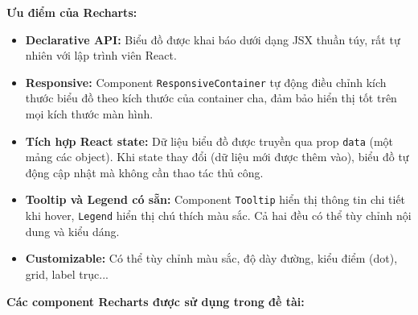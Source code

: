 \textbf{Ưu điểm của Recharts:}
\begin{itemize}
    \item \textbf{Declarative API:} Biểu đồ được khai báo dưới dạng JSX thuần túy, rất tự nhiên với lập trình viên React.
    \item \textbf{Responsive:} Component \texttt{ResponsiveContainer} tự động điều chỉnh kích thước biểu đồ theo kích thước của container cha, đảm bảo hiển thị tốt trên mọi kích thước màn hình.
    \item \textbf{Tích hợp React state:} Dữ liệu biểu đồ được truyền qua prop \texttt{data} (một mảng các object). Khi state thay đổi (dữ liệu mới được thêm vào), biểu đồ tự động cập nhật mà không cần thao tác thủ công.
    \item \textbf{Tooltip và Legend có sẵn:} Component \texttt{Tooltip} hiển thị thông tin chi tiết khi hover, \texttt{Legend} hiển thị chú thích màu sắc. Cả hai đều có thể tùy chỉnh nội dung và kiểu dáng.
    \item \textbf{Customizable:} Có thể tùy chỉnh màu sắc, độ dày đường, kiểu điểm (dot), grid, label trục...
\end{itemize}

\textbf{Các component Recharts được sử dụng trong đề tài:}

